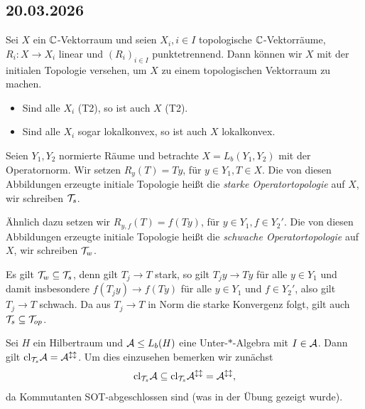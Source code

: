 \subsection*{20.03.2026}

Sei $X$ ein $\mathbb{C}$-Vektorraum und seien $X_i, i \in I$ topologische $\mathbb{C}$-Vektorräume, $R_i : X \to X_i$ linear und $(R_i)_{i \in I}$ punktetrennend. Dann können wir $X$ mit der initialen Topologie versehen, um $X$ zu einem topologischen Vektorraum zu machen.

\begin{itemize}
    \item Sind alle $X_i$ (T2), so ist auch $X$ (T2).
    \item Sind alle $X_i$ sogar lokalkonvex, so ist auch $X$ lokalkonvex.
\end{itemize}

Seien $Y_1, Y_2$ normierte Räume und betrachte $X = L_b(Y_1, Y_2)$ mit der Operatornorm. Wir setzen $R_y(T) = Ty$, für $y \in Y_1, T \in X$. Die von diesen Abbildungen erzeugte initiale Topologie heißt die \emph{starke Operatortopologie} auf $X$, wir schreiben $\mathcal{T}_s$.

Ähnlich dazu setzen wir $R_{y,f}(T) = f(Ty)$, für $y \in Y_1, f \in Y_2'$. Die von diesen Abbildungen erzeugte initiale Topologie heißt die \emph{schwache Operatortopologie} auf $X$, wir schreiben $\mathcal{T}_w$.

Es gilt $\mathcal{T}_w \subseteq \mathcal{T}_s$, denn gilt $T_j \to T$ stark, so gilt $T_j y \to Ty$ für alle $y \in Y_1$ und damit insbesondere $f(T_j y) \to f(T y)$ für alle $y \in Y_1$ und $f \in Y_2'$, also gilt $T_j \to T$ schwach. Da aus $T_j \to T$ in Norm die starke Konvergenz folgt, gilt auch $\mathcal{T}_s \subseteq \mathcal{T}_{op}$.

\medbreak

Sei $H$ ein Hilbertraum und $\mathcal{A} \leq L_b(H)$ eine Unter-$\ast$-Algebra mit $I \in \mathcal{A}$. Dann gilt $\mathrm{cl}_{\mathcal{T}_s} \mathcal{A} = \mathcal{A}^{\updownarrow\updownarrow}$. Um dies einzusehen bemerken wir zunächst
$$ \mathrm{cl}_{\mathcal{T}_s} \mathcal{A} \subseteq \mathrm{cl}_{\mathcal{T}_s} \mathcal{A}^{\updownarrow\updownarrow} = \mathcal{A}^{\updownarrow\updownarrow}, $$
da Kommutanten SOT-abgeschlossen sind (was in der Übung gezeigt wurde).

